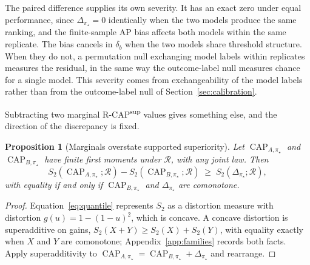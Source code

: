 \documentclass[11pt]{article}
\newcommand{\CAP}{\operatorname{CAP}}
\newcommand{\Regime}{\mathcal{R}}
\newtheorem{proposition}{Proposition}
\theoremstyle{remark}
\begin{document}
The paired difference supplies its own severity. It has an exact zero under equal performance, since $\Delta_{\pi_\star}=0$ identically when the two models produce the same ranking, and the finite-sample AP bias affects both models within the same replicate. The bias cancels in $\delta_b$ when the two models share threshold structure. When they do not, a permutation null exchanging model labels within replicates measures the residual, in the same way the outcome-label null measures chance for a single model. This severity comes from exchangeability of the model labels rather than from the outcome-label null of Section~\ref{sec:calibration}.

Subtracting two marginal R-CAP\textsuperscript{sup} values gives something else, and the direction of the discrepancy is fixed.

\begin{proposition}[Marginals overstate supported superiority]
Let $\CAP_{A,\pi_\star}$ and $\CAP_{B,\pi_\star}$ have finite first moments under $\Regime$, with any joint law. Then
\[
S_2(\CAP_{A,\pi_\star};\Regime)
-
S_2(\CAP_{B,\pi_\star};\Regime)
\;\geq\;
S_2(\Delta_{\pi_\star};\Regime),
\]
with equality if and only if $\CAP_{B,\pi_\star}$ and $\Delta_{\pi_\star}$ are comonotone.
\end{proposition}

\begin{proof}
Equation~\eqref{eq:quantile} represents $S_2$ as a distortion measure with distortion $g(u)=1-(1-u)^2$, which is concave. A concave distortion is superadditive on gains, $S_2(X+Y)\geq S_2(X)+S_2(Y)$, with equality exactly when $X$ and $Y$ are comonotone; Appendix~\ref{app:families} records both facts. Apply superadditivity to $\CAP_{A,\pi_\star}=\CAP_{B,\pi_\star}+\Delta_{\pi_\star}$ and rearrange.
\end{proof}
\end{document}
